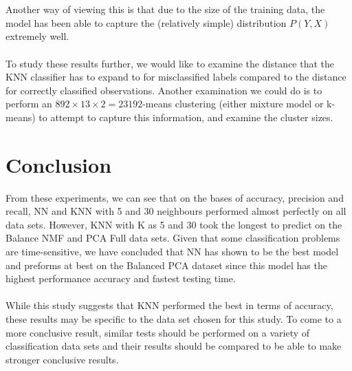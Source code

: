 \documentclass{article}
\begin{document}
\begin{multicols}{2}
\\\\
Another way of viewing this is that due to the size of the training data, the model has been able to capture the (relatively simple) distribution $P\left(Y, X\right)$ extremely well.
\\\\
To study these results further, we would like to examine the distance that the KNN classifier has to expand to for misclassified labels compared to the distance for correctly classified observations. Another examination we could do is to perform an $892\times 13\times 2 = 23192$-means clustering (either mixture model or k-means) to attempt to capture this information, and examine the cluster sizes.


\section{Conclusion}
From these experiments, we can see that on the bases of accuracy, precision and recall, NN and KNN with 5 and 30 neighbours performed almost perfectly on all data sets. However, KNN with K as 5 and 30 took the longest to predict on the Balance NMF and PCA Full data sets. Given that some classification problems are time-sensitive, we have concluded that NN has shown to be the best model and preforms at best on the Balanced PCA dataset since this model has the highest performance accuracy and fastest testing time.  
\\\\
While this study suggests that KNN performed the best in terms of accuracy, these results may be specific to the data set chosen for this study. To come to a more conclusive result, similar tests should be performed on a variety of classification data sets and their results should be compared to be able to make stronger conclusive results.
\end{multicols}
\end{document}

